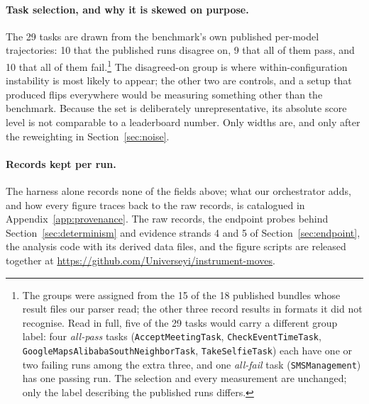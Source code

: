 \paragraph{Task selection, and why it is skewed on purpose.} The 29 tasks are
drawn from the benchmark's own published per-model trajectories: 10 that the
published runs disagree on, 9 that all of them pass, and 10 that all of them
fail.\footnote{%
The groups were assigned from the 15 of the 18 published bundles whose result files our parser read;
the other three record results in formats it did not recognise. Read in full, five of the 29 tasks would
carry a different group label: four \emph{all-pass} tasks (\texttt{AcceptMeetingTask},
\texttt{CheckEventTimeTask}, \texttt{GoogleMapsAlibabaSouthNeighborTask}, \texttt{TakeSelfieTask})
each have one or two failing runs among the extra three, and one \emph{all-fail} task
(\texttt{SMSManagement}) has one passing run. The selection and every measurement are unchanged; only the
label describing the published runs differs.} The disagreed-on group is where within-configuration instability is most
likely to appear; the other two are controls, and a setup that produced flips
everywhere would be measuring something other than the benchmark. Because the
set is deliberately unrepresentative, its absolute score level is not
comparable to a leaderboard number. Only widths are, and only after the
reweighting in Section~\ref{sec:noise}.

\paragraph{Records kept per run.} The harness alone records none of the fields
above; what our orchestrator adds, and how every figure traces back to the raw
records, is catalogued in Appendix~\ref{app:provenance}. The raw records, the
endpoint probes behind Section~\ref{sec:determinism} and evidence strands 4 and
5 of Section~\ref{sec:endpoint}, the analysis code with its derived data files,
and the figure scripts are released together at \url{https://github.com/Universeyi/instrument-moves}.
